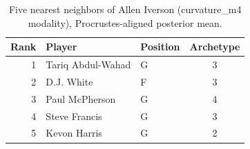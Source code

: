\begin{table}[htbp]
  \centering\small
  \begin{tabular}{rllc}
    \toprule
    Rank & Player & Position & Archetype \\
    \midrule
    1 & Tariq Abdul-Wahad & G & 3 \\
    2 & D.J. White & F & 3 \\
    3 & Paul McPherson & G & 4 \\
    4 & Steve Francis & G & 3 \\
    5 & Kevon Harris & G & 2 \\
    \bottomrule
  \end{tabular}
  \caption{Five nearest neighbors of Allen Iverson (curvature_m4 modality), Procrustes-aligned posterior mean.}
  \label{tab:Allen_Iverson_neighbors_curvature_m4}
\end{table}

